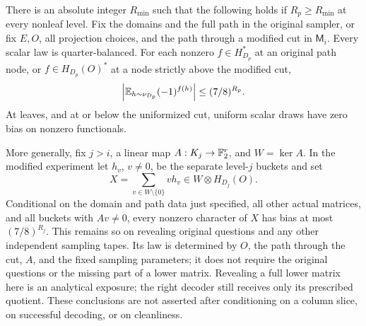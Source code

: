 \begin{lemma}\label{lem:bias}
There is an absolute integer $R_{\min}$ such that the following holds if
$R_p\ge R_{\min}$ at every nonleaf level.  Fix the domains and the full path
in the original sampler, or fix $E,O$, all projection choices, and the path
through a modified cut in $\mathsf M_i$.  Every scalar law is quarter-balanced.
For each nonzero $f\in H_{D_p}^*$ at an original path node, or
$f\in H_{D_p}(O)^*$ at a node strictly above the modified cut,
\begin{equation}\label{eq:scalar-bias}
 \left|\mathbb E_{h\sim\nu_{D_p}}(-1)^{f(h)}\right|
       \le (7/8)^{R_p}.
\end{equation}
At leaves, and at or below the uniformized cut, uniform scalar draws have
zero bias on nonzero functionals.

More generally, fix $j>i$, a linear map $A:K_j\to\mathbb F_2^r$, and $W=\ker A$.
In the modified experiment let $h_v$, $v\ne0$, be the separate level-$j$
buckets and set
\[
 X=\sum_{v\in W\setminus\{0\}}v h_v
     \in W\otimes H_{D_j}(O).
\]
Conditional on the domain and path data just specified, all other actual
matrices, and all buckets with $Av\ne0$, every nonzero character of $X$ has
bias at most $(7/8)^{R_j}$.  This remains so on revealing original questions
and any other independent sampling tapes.  Its law is determined by $O$,
the path through the cut, $A$, and the fixed sampling parameters; it does
not require the original questions or the missing part of a lower matrix.
Revealing a full lower matrix here is an analytical exposure; the right
decoder still receives only its prescribed quotient.  These conclusions
are not asserted after conditioning on a column slice, on successful
decoding, or on cleanliness.
\end{lemma}

